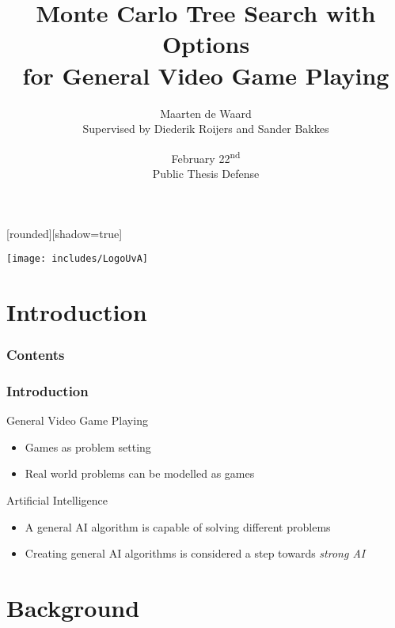 \documentclass[aspectratio=169]{beamer}
\author[Maarten de Waard]{Maarten de Waard\\\small{Supervised by Diederik
	Roijers and Sander Bakkes}}
\title[O-MCTS for GVGP]{Monte Carlo Tree Search with Options\\for General Video Game Playing}
\date{February 22\textsuperscript{nd}\\Public Thesis Defense}
\begin{document}
[rounded][shadow=true]
\begin{frame}
	\vspace{-4.7em}
	\centerline{
	\texttt{[image: includes/LogoUvA]}
	}
	\maketitle
\end{frame}

\section{Introduction}

\begin{frame}
	\frametitle{Contents}
	\tableofcontents
\end{frame}

\begin{frame}
	\frametitle{Introduction}
	\begin{block}{General Video Game Playing}
		\begin{itemize}
			\item Games as problem setting
			\item Real world problems can be modelled as games
		\end{itemize}
	\end{block}
	\begin{block}{Artificial Intelligence}
		\begin{itemize}
			\item A general AI algorithm is capable of solving different problems
			\item Creating general AI algorithms is considered a step towards \emph{strong AI}
		\end{itemize}
	\end{block}
\end{frame}

\section{Background}
\end{document}
